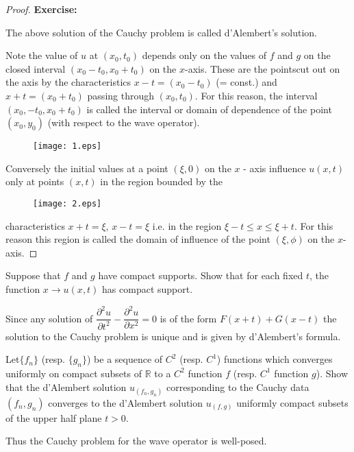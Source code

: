\begin{proof}
{\bf Exercise:}

The above solution of the Cauchy problem is called d'Alembert's solution.

Note the value of $u$ at $(x_{0},t_{0})$ depends only on the values of $f$ and $g$ on the closed interval $(x_{0}-t_{0}, x_{0}+t_{0})$ on the $x$-axis. These are the points\pageoriginale cut out on the axis by the characteristics $x-t=(x_{0}-t_{0})$ (= const.) and $x+t=(x_{0}+t_{0})$ passing through $(x_{0},t_{0})$. For this reason, the interval $(x_{0},-t_{0},x_{0}+t_{0})$ is called the interval or domain of dependence of the point $(x_{0},y_{0})$ (with respect to the wave operator).
\begin{figure}[H]
\centering
\texttt{[image: 1.eps]}
\end{figure}

Conversely the initial values at a point $(\xi,0)$ on the $x$ - axis influence $u(x,t)$ only at points $(x,t)$ in the region bounded by the
\begin{figure}[H]
\centering
\texttt{[image: 2.eps]}
\end{figure}
\noindent
characteristics $x+t=\xi$, $x-t=\xi$ i.e. in the region $\xi-t\leq x\leq \xi+t$. For this reason this region is called the domain of influence of the point $(\xi,\phi)$ on the $x$-axis.
\end{proof}

\begin{exer*}
Suppose that $f$ and $g$ have compact supports. Show that for each fixed $t$, the function $x\to u(x,t)$ has compact support.
\end{exer*}

Since any solution of $\dfrac{\partial^{2}u}{\partial t^{2}}-\dfrac{\partial^{2}u}{\partial x^{2}}=0$ is of the form $F(x+t)+G(x-t)$ the solution to the Cauchy problem is unique and is given by d'Alembert's formula.

\begin{exer*}
Let\pageoriginale $\{f_{n}\}$ (resp. $\{g_{n}\}$) be a sequence of $C^{2}$ (resp. $C^{1}$) functions which converges uniformly on compact subsets of $\mathbb{R}$ to a $C^{2}$ function $f$ (resp. $C^{1}$ function $g$). Show that the d'Alembert solution $u_{(f_{n},g_{n})}$ corresponding to the Cauchy data $(f_{n},g_{n})$ converges to the d'Alembert solution $u_{(f,g)}$ uniformly compact subsets of the upper half plane $t>0$.
\end{exer*}

Thus the Cauchy problem for the wave operator is well-posed.

